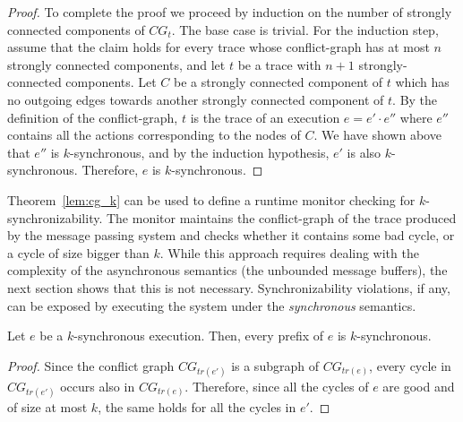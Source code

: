 \begin{proof}
To complete the proof we proceed by induction on the number of strongly connected components of $CG_t$. The base case is trivial. 
 For the induction step, assume that the claim holds for every trace whose conflict-graph has at most $n$ strongly connected components, and 
 let $t$ be a trace with $n+1$ strongly-connected components.  
 Let $C$ be a strongly connected component of $t$ which has no outgoing edges towards another strongly connected component of $t$. 
 By the definition of the conflict-graph, $t$ is the trace of an execution $e=e'\cdot e''$ where $e''$ contains all the actions corresponding to the nodes of $C$. 
 We have shown above that $e''$ is $k$-synchronous, and by the induction hypothesis, $e'$ is also $k$-synchronous. Therefore, $e$ is $k$-synchronous.
\end{proof}

Theorem~\ref{lem:cg_k} can be used to define a runtime monitor checking for $k$-synchronizability. 
The monitor maintains the conflict-graph of the trace produced by the message passing system and checks whether it contains some bad cycle, or a cycle of size bigger than $k$.
While this approach requires dealing with the complexity of the asynchronous semantics (the unbounded message buffers), the next section shows that this is not necessary. Synchronizability violations, if any, can be exposed by executing the system under the \emph{synchronous} semantics.

\begin{theorem}
Let $e$ be a $k$-synchronous execution. Then, every prefix of $e$ is $k$-synchronous. 
\end{theorem}
\begin{proof}
Since the conflict graph $CG_{tr(e')}$ is a subgraph of $CG_{tr(e)}$, every cycle in $CG_{tr(e')}$ occurs also in $CG_{tr(e)}$. Therefore, since all the cycles of $e$ are good and of size at most $k$, the same holds for all the cycles in $e'$.
\end{proof}


